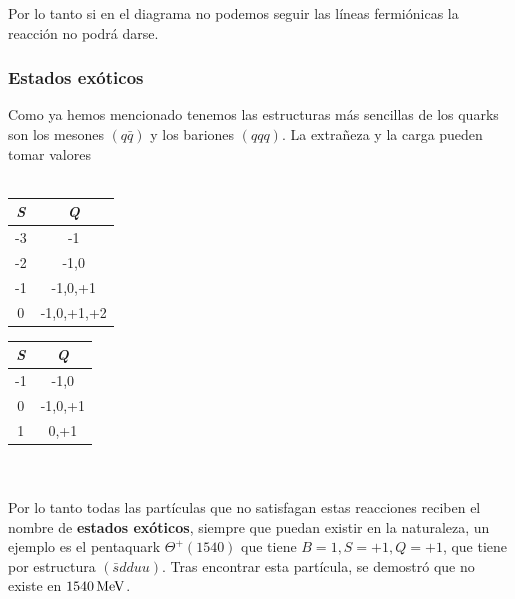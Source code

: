 Por lo tanto si en el diagrama no podemos seguir las líneas fermiónicas la reacción no podrá darse.

\subsubsection{Estados exóticos}
Como ya hemos mencionado tenemos las estructuras más sencillas de los quarks son los mesones $(q\bar{q})$ y los bariones $(qqq)$. La extrañeza y la carga pueden tomar valores\\\\
\noindent
\begin{minipage}{0.45\linewidth}
    \centering
\begin{tabular}{|cc|}
\hline
\textit{S} & \textit{Q} \\
\hline \hline
-3         & -1         \\
-2         & -1,0       \\
-1         & -1,0,+1    \\
0          & -1,0,+1,+2 \\
\hline
\end{tabular}
\label{tab: cargay y extraeza bariones}
\end{minipage}
\hfill
\begin{minipage}{0.45\linewidth}
    \centering
\begin{tabular}{|cc|}
\hline
\textit{S} & \textit{Q} \\
\hline \hline
-1         & -1,0       \\
0          & -1,0,+1    \\
1          & 0,+1      \\
\hline
\end{tabular}
\label{tab: cargay y extraeza mesones}
\end{minipage}
\\\\
Por lo tanto todas las partículas que no satisfagan estas reacciones reciben el nombre de \textbf{estados exóticos}, siempre que puedan existir en la naturaleza, un ejemplo es el pentaquark $\Theta^+(1540)$ que tiene $B=1, S=+1, Q=+1$, que tiene por estructura $(\bar{s}dduu)$. Tras encontrar esta partícula, se demostró que no existe en $\unit[1540]{MeV}$.
